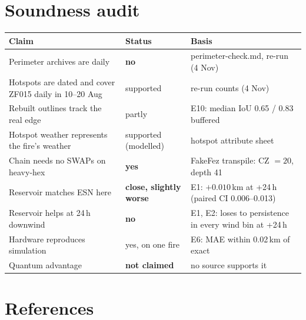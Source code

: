 \documentclass[11pt,a4paper]{article}
\begin{document}
\section{Soundness audit}

\begin{center}\small
\begin{tabularx}{\linewidth}{@{}Y l Y@{}}
\toprule
\textbf{Claim} & \textbf{Status} & \textbf{Basis}\\
\midrule
Perimeter archives are daily & \textbf{no} & perimeter-check.md, re-run (4 Nov)\\
Hotspots are dated and cover ZF015 daily in 10--20 Aug & supported & re-run counts (4 Nov)\\
Rebuilt outlines track the real edge & partly & E10: median IoU 0.65 / 0.83 buffered\\
Hotspot weather represents the fire's weather & supported (modelled) & hotspot attribute sheet\\
Chain needs no SWAPs on heavy-hex & \textbf{yes} & FakeFez transpile: CZ $=20$, depth 41\\
Reservoir matches ESN here & \textbf{close, slightly worse} & E1: $+0.010$\,km at +24\,h (paired CI 0.006--0.013)\\
Reservoir helps at 24\,h downwind & \textbf{no} & E1, E2: loses to persistence in every wind bin at +24\,h\\
Hardware reproduces simulation & yes, on one fire & E6: MAE within 0.02\,km of exact\\
Quantum advantage & \textbf{not claimed} & no source supports it\\
\bottomrule
\end{tabularx}
\end{center}

\hypertarget{refs}{}
\section*{References}
\end{document}
